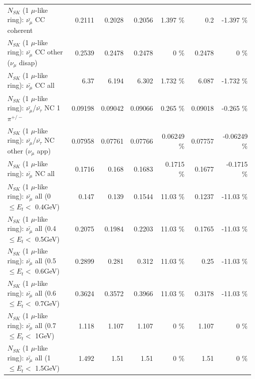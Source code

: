 \begin{table}
\begin{tabular}{| l | r | r | r  r | r  r |}
                       $N_{SK}$ (1 $\mu$-like ring): $\bar{\nu_\mu}$ CC coherent &          0.2111 &          0.2028 &          0.2056 &    1.397 \%  &             0.2 &   -1.397 \%  \\ 
        $N_{SK}$ (1 $\mu$-like ring): $\bar{\nu_\mu}$ CC other ($\nu_\mu$ disap) &          0.2539 &          0.2478 &          0.2478 &        0 \%  &          0.2478 &        0 \%  \\ 
                          $N_{SK}$ (1 $\mu$-like ring): $\bar{\nu_{\mu}}$ CC all &            6.37 &           6.194 &           6.302 &    1.732 \%  &           6.087 &   -1.732 \%  \\ 
\hline
  $N_{SK}$ (1 $\mu$-like ring): $\bar{\nu_\mu}$/$\bar{\nu_\tau}$ NC 1$\pi^{+/-}$ &         0.09198 &         0.09042 &         0.09066 &    0.265 \%  &         0.09018 &   -0.265 \%  \\ 
$N_{SK}$ (1 $\mu$-like ring): $\bar{\nu_\mu}$/$\bar{\nu_\tau}$ NC other ($\nu_\mu$ app) &         0.07958 &         0.07761 &         0.07766 &  0.06249 \%  &         0.07757 & -0.06249 \%  \\ 
                          $N_{SK}$ (1 $\mu$-like ring): $\bar{\nu_{\mu}}$ NC all &          0.1716 &           0.168 &          0.1683 &   0.1715 \%  &          0.1677 &  -0.1715 \%  \\ 
\hline
   $N_{SK}$ (1 $\mu$-like ring): $\bar{\nu_{\mu}}$ all (0 $\leq E_{t} <$ 0.4GeV) &           0.147 &           0.139 &          0.1544 &    11.03 \%  &          0.1237 &   -11.03 \%  \\ 
 $N_{SK}$ (1 $\mu$-like ring): $\bar{\nu_{\mu}}$ all (0.4 $\leq E_{t} <$ 0.5GeV) &          0.2075 &          0.1984 &          0.2203 &    11.03 \%  &          0.1765 &   -11.03 \%  \\ 
 $N_{SK}$ (1 $\mu$-like ring): $\bar{\nu_{\mu}}$ all (0.5 $\leq E_{t} <$ 0.6GeV) &          0.2899 &           0.281 &           0.312 &    11.03 \%  &            0.25 &   -11.03 \%  \\ 
 $N_{SK}$ (1 $\mu$-like ring): $\bar{\nu_{\mu}}$ all (0.6 $\leq E_{t} <$ 0.7GeV) &          0.3624 &          0.3572 &          0.3966 &    11.03 \%  &          0.3178 &   -11.03 \%  \\ 
   $N_{SK}$ (1 $\mu$-like ring): $\bar{\nu_{\mu}}$ all (0.7 $\leq E_{t} <$ 1GeV) &           1.118 &           1.107 &           1.107 &        0 \%  &           1.107 &        0 \%  \\ 
   $N_{SK}$ (1 $\mu$-like ring): $\bar{\nu_{\mu}}$ all (1 $\leq E_{t} <$ 1.5GeV) &           1.492 &            1.51 &            1.51 &        0 \%  &            1.51 &        0 \%  \\ 

\end{tabular}
\end{table}
